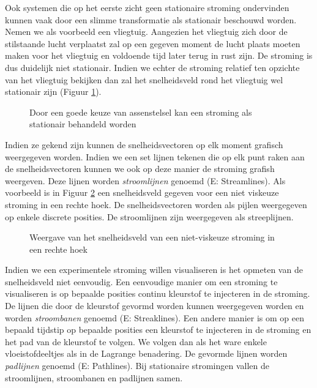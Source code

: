 Ook systemen die op het eerste zicht geen stationaire stroming ondervinden kunnen vaak door een slimme transformatie als stationair beschouwd worden. Nemen we als voorbeeld een vliegtuig. Aangezien het vliegtuig zich door de stilstaande lucht verplaatst zal op een gegeven moment de lucht plaats moeten maken voor het vliegtuig en voldoende tijd later terug in rust zijn. De stroming is dus duidelijk niet stationair. Indien we echter de stroming relatief ten opzichte van het vliegtuig bekijken dan zal het snelheidsveld rond het vliegtuig wel stationair zijn (Figuur \ref{fig:stationaire stroming vliegtuig}). 
\begin{figure}[htb]
	\centering
	
	\caption{Door een goede keuze van assenstelsel kan een stroming als stationair behandeld worden}
	\label{fig:stationaire stroming vliegtuig}
\end{figure}

Indien ze gekend zijn kunnen de snelheidsvectoren op elk moment grafisch weergegeven worden. Indien we een set lijnen tekenen die op elk punt raken aan de snelheidsvectoren kunnen we ook op deze manier de stroming grafish weergeven. Deze lijnen worden \emph{stroomlijnen} genoemd (E: Streamlines). Als voorbeeld is in Figuur \ref{fig:snelheidsveld} een snelheidsveld gegeven voor een niet viskeuze stroming in een rechte hoek. De snelheidsvectoren worden als pijlen weergegeven op enkele discrete posities. De stroomlijnen zijn weergegeven als streeplijnen.
\begin{figure}[htb]
	\centering
	
	\caption{Weergave van het snelheidsveld van een niet-viskeuze stroming in een rechte hoek}
	\label{fig:snelheidsveld}
\end{figure}
Indien we een experimentele stroming willen visualiseren is het opmeten van de snelheidsveld niet eenvoudig. Een eenvoudige manier om een stroming te visualiseren is op bepaalde posities continu kleurstof te injecteren in de stroming. De lijnen die door de kleurstof gevormd worden kunnen weergegeven worden en worden \emph{stroombanen} genoemd (E: Streaklines).
Een andere manier is om op een bepaald tijdstip op bepaalde posities een kleurstof te injecteren in de stroming en het pad van de kleurstof te volgen. We volgen dan als het ware enkele vloeistofdeeltjes als in de Lagrange benadering. De gevormde lijnen worden \emph{padlijnen} genoemd (E: Pathlines).
Bij stationaire stromingen vallen de stroomlijnen, stroombanen en padlijnen samen.

